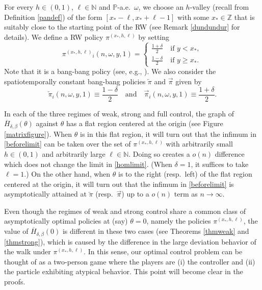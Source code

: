 \documentclass[a4paper]{amsart}
\numberwithin{equation}{section}
\theoremstyle{plain}
\theoremstyle{remark}
\begin{document}
For every $h\in(0,1)$, $\ell\in\mathbb{N}$ and $\mathbb{P}$-a.e.\ $\omega$, we choose an $h$-valley (recall from Definition \ref{pandef}) of the form $[x_*-\ell,x_*+\ell-1]$ with some $x_*\in\mathbb{Z}$ that is suitably close to the starting point of the RW (see Remark \ref{dundundur} for details). 
We define a RW policy ${\pi^{(x_*,h,\ell)}}$ by setting
\begin{equation}\label{pengol}
{\pi^{(x_*,h,\ell)}}_i(n,\omega,y,1) = \begin{cases}\frac{1 + \delta}{2}&\ \text{if $y < x_*$},\\
\frac{1 - \delta}{2}&\ \text{if $y \ge x_*$}.\end{cases}
\end{equation}
Note that it is a bang-bang policy (see, e.g., \cite{Art1980}). We also consider the spatiotemporally constant bang-bang policies ${\overleftarrow\pi}$ and ${\overrightarrow\pi}$ given by
\begin{equation}\label{sagsol}
{\overleftarrow\pi}_i(n,\omega,y,1) \equiv \frac{1 - \delta}{2}\quad\text{and}\quad{\overrightarrow\pi}_i(n,\omega,y,1) \equiv \frac{1 + \delta}{2}.
\end{equation}

In each of the three regimes of weak, strong and full control, the graph of $\overline H_{\delta,\beta}(\theta)$ against $\theta$ has a flat region centered at the origin (see Figure \ref{matrixfigure}). When $\theta$ is in this flat region, it will turn out that the infimum in \eqref{beforelimit} can be taken over the set of ${\pi^{(x_*,h,\ell)}}$ with arbitrarily small $h\in(0,1)$ and arbitrarily large $\ell\in\mathbb{N}$. Doing so creates a $o(n)$ difference which does not change the limit in \eqref{homlimit}. (When $\delta = 1$, it suffices to take $\ell = 1$.) On the other hand, when $\theta$ is to the right (resp.\ left) of the flat region centered at the origin, it will turn out that the infimum in \eqref{beforelimit} is asymptotically attained at ${\overleftarrow\pi}$ (resp.\ ${\overrightarrow\pi}$) up to a $o(n)$ term as $n\to\infty$.

Even though the regimes of weak and strong control share a common class of asymptotically optimal policies at (say) $\theta = 0$, namely the policies ${\pi^{(x_*,h,\ell)}}$, the value of $\overline H_{\delta,\beta}(0)$ is different in these two cases (see Theorems \ref{thmweak} and \ref{thmstrong}), which is caused by the difference in the large deviation behavior of the walk under ${\pi^{(x_*,h,\ell)}}$. In this sense, our optimal control problem can be thought of as a two-person game where the players are (i) the controller and (ii) the particle exhibiting atypical behavior. This point will become clear in the proofs.
\end{document}
